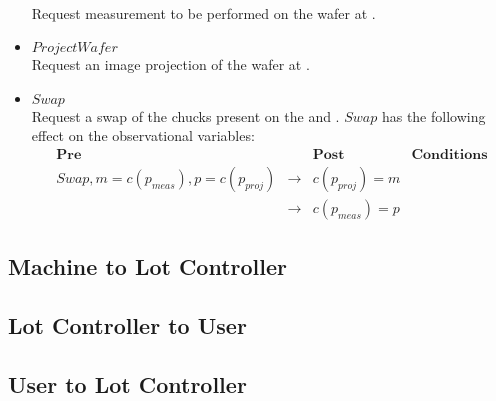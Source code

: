 \begin{itemize}
\\Request measurement to be performed on the wafer at \chuckMeas.
\item $\mathit{ProjectWafer}$
\\Request an image projection of the wafer at \chuckProj.
\item $\mathit{Swap}$
\\Request a swap of the chucks present on the \chuckMeas and \chuckProj.
$\mathit{Swap}$ has the following effect on the observational variables:
\begin{align*}
&\textbf{Pre}&&\textbf{Post}&\textbf{Conditions}&\\
&Swap, m = c(p_\mathit{meas}), p = c(p_\mathit{proj})&\rightarrow&c(p_\mathit{proj}) = m&&\\
&&\rightarrow&c(p_\mathit{meas}) = p&&
\end{align*}
\end{itemize}

\subsection{Machine to Lot Controller}

\subsection{Lot Controller to User}

\subsection{User to Lot Controller}
